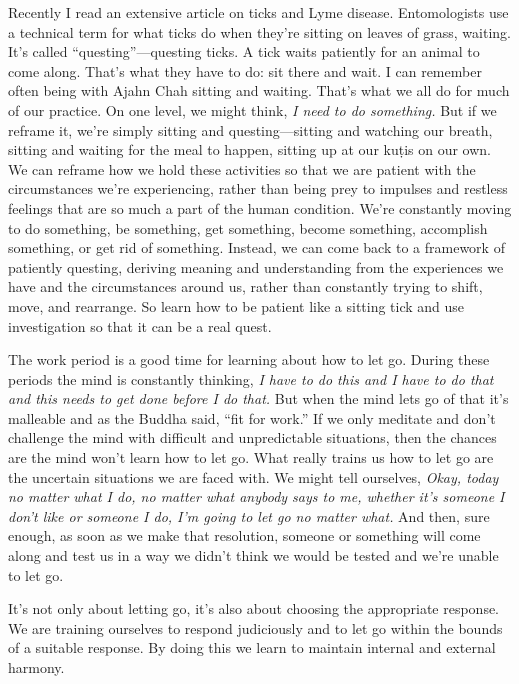 Recently I read an extensive article on ticks and Lyme disease. 
Entomologists use a technical term for what ticks do when they're 
sitting on leaves of grass, waiting. It's called 
``questing''---questing ticks. A tick waits patiently for an animal to 
come along. That's what they have to do: sit there and wait. I can 
remember often being with Ajahn Chah sitting and waiting. That's what 
we all do for much of our practice. On one level, we might think, 
\emph{I need to do something.} But if we reframe it, we're simply 
sitting and questing---sitting and watching our breath, sitting and 
waiting for the meal to happen, sitting up at our kuṭis on our own. 
We can reframe how we hold these activities so that we are patient with 
the circumstances we're experiencing, rather than being prey to 
impulses and restless feelings that are so much a part of the human 
condition. We're constantly moving to do something, be something, get 
something, become something, accomplish something, or get rid of 
something. Instead, we can come back to a framework of patiently 
questing, deriving meaning and understanding from the experiences we 
have and the circumstances around us, rather than constantly trying to 
shift, move, and rearrange. So learn how to be patient like a sitting 
tick and use investigation so that it can be a real quest.


The work period is a good time for learning about how to let go. During 
these periods the mind is constantly thinking, \emph{I have to do this 
and I have to do that and this needs to get done before I do that.} But 
when the mind lets go of that it's malleable and as the Buddha said, 
``fit for work.'' If we only meditate and don't challenge the mind with 
difficult and unpredictable situations, then the chances are the mind 
won't learn how to let go. What really trains us how to let go are the 
uncertain situations we are faced with. We might tell ourselves, 
\emph{Okay, today no matter what I do, no matter what anybody says to 
me, whether it's someone I don't like or someone I do, I'm going to let 
go no matter what.} And then, sure enough, as soon as we make that 
resolution, someone or something will come along and test us in a way 
we didn't think we would be tested and we're unable to let go.

It's not only about letting go, it's also about choosing the 
appropriate response. We are training ourselves to respond judiciously 
and to let go within the bounds of a suitable response. By doing this 
we learn to maintain internal and external harmony.

